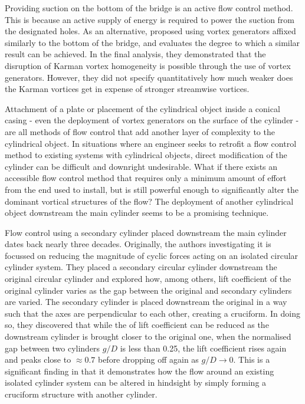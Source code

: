 \documentclass[oneside]{utmthesis}
\begin{document}
Providing suction on the bottom of the bridge is an active flow control method. This is because an active supply of energy is required to power the suction from the designated holes. As an alternative, \citet{Zhang2019} proposed using vortex generators affixed similarly to the bottom of the bridge, and evaluates the degree to which a similar result can be achieved. In the final analysis, they demonstrated that the disruption of Karman vortex homogeneity is possible through the use of vortex generators. However, they did not specify quantitatively how much weaker does the Karman vortices get in expense of stronger streamwise vortices.

Attachment of a plate \citep{Gibeau2019} or placement of the cylindrical object inside a conical casing \citep{Lin2018} - even the deployment of vortex generators on the surface of the cylinder \citep{Zhang2019} - are all methods of flow control that add another layer of complexity to the cylindrical object. In situations where an engineer seeks to retrofit a flow control method to existing systems with cylindrical objects, direct modification of the cylinder can be difficult and downright undesirable. What if there exists an accessible flow control method that requires only a minimum amount of effort from the end used to install, but is still powerful enough to significantly alter the dominant vortical structures of the flow? The deployment of another cylindrical object downstream the main cylinder seems to be a promising technique.

Flow control using a secondary cylinder placed downstream the main cylinder dates back nearly three decades. Originally, the authors investigating it \citep{Shirakashi1989} is focussed on reducing the magnitude of cyclic forces acting on an isolated circular cylinder system. They placed a secondary circular cylinder downstream the original circular cylinder and explored how, among others, \rms{} lift coefficient of the original cylinder varies as the gap between the original and secondary cylinders are varied. The secondary cylinder is placed downstream the original in a way such that the axes are perpendicular to each other, creating a cruciform. In doing so, they discovered that while the \rms{} of lift coefficient can be reduced as the downstream cylinder is brought closer to the original one, when the normalised gap between two cylinders $g/D$ is less than 0.25, the lift coefficient rises again and peaks close to $\approx 0.7$ before dropping off again as $g/D \to 0$. This is a significant finding in that it demonstrates how the flow around an existing isolated cylinder system can be altered in hindsight by simply forming a cruciform structure with another cylinder.
\end{document}
